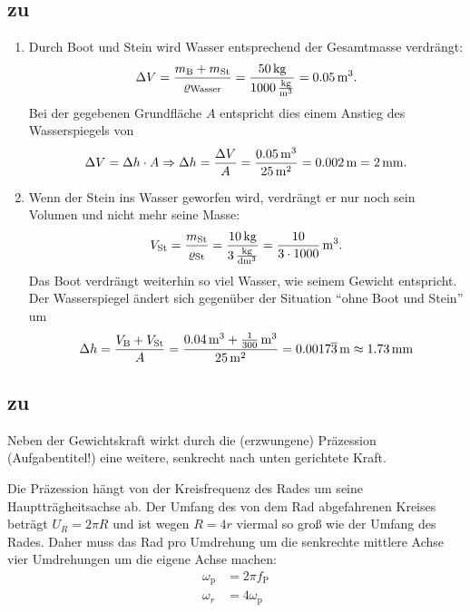\documentclass[a4paper]{scrartcl}
\begin{document}
\subsection{zu }
\label{lsg:Auftrieb}
\begin{enumerate}[noitemsep]
  \item Durch Boot und Stein wird Wasser entsprechend der Gesamtmasse verdrängt:
  \begin{equation*}
    \Delta V = \frac{m_\text{B} + m_\text{St}}{\varrho_\text{Wasser}} = \frac{\unit[50]{kg}}{\unit[1000]{\frac{kg}{m^3}}} = \unit[0.05]{m^3}.
  \end{equation*}
  Bei der gegebenen Grundfläche $A$ entspricht dies einem Anstieg des Wasserspiegels von
  \begin{equation*}
    \Delta V = \Delta h \cdot A \Rightarrow \Delta h = \frac{\Delta V}{A} = \frac{\unit[0.05]{m^3}}{\unit[25]{m^2}} = \unit[0.002]{m} = \unit[2]{mm}.
  \end{equation*}

  \item Wenn der Stein ins Wasser geworfen wird, verdrängt er nur noch sein Volumen und nicht mehr seine Masse:
\begin{equation*}
  V_\text{St} = \frac{m_\text{St}}{\varrho_\text{St}} = \frac{\unit[10]{kg}}{\unit[3]{\frac{kg}{dm^3}}} = \unit[\frac{10}{3\cdot 1000}]{m^3}.
\end{equation*}
Das Boot verdrängt weiterhin so viel Wasser, wie seinem Gewicht entspricht. Der Wasserspiegel ändert sich gegenüber der Situation "`ohne Boot und Stein"' um
\begin{equation*}
  \Delta h = \frac{V_\text{B} + V_\text{St}}{A} = \frac{\unit[0.04]{m^3} + \unit[\frac{1}{300}]{m^3}}{\unit[25]{m^2}} = \unit[0.0017\overline 3]{m} \approx \unit[1.73]{mm}
\end{equation*}
\end{enumerate}

\subsection{zu }
\label{lsg:Kollergang}
Neben der Gewichtskraft wirkt durch die (erzwungene) Präzession (Aufgabentitel!) eine weitere, senkrecht nach unten gerichtete Kraft.

Die Präzession hängt von der Kreisfrequenz des Rades um seine Hauptträgheitsachse ab. Der Umfang des von dem Rad abgefahrenen Kreises beträgt $U_R = 2\pi R$ und ist wegen $R = 4r$ viermal so groß wie der Umfang des Rades. Daher muss das Rad pro Umdrehung um die senkrechte mittlere Achse vier Umdrehungen um die eigene Achse machen:
\begin{align*}
  \omega_\text{p} & = 2\pi f_\text{P}\\
  \omega_r & = 4 \omega_\text{p}
\end{align*}
\end{document}
